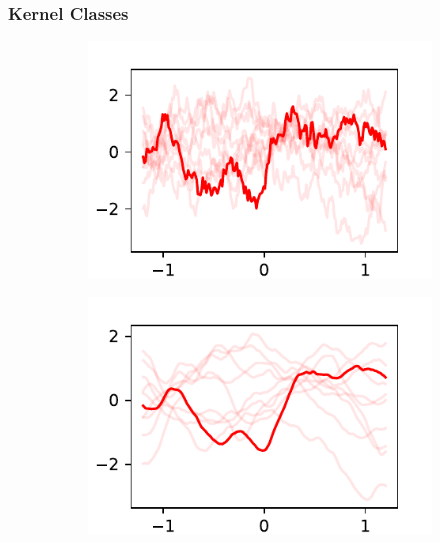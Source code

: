 \documentclass{beamer}
\begin{document}
\begin{frame}
    \frametitle{Kernel Classes}
    \begin{figure}
        \centering
        \begin{subfigure}[t]{0.4\textwidth}
            \centering
            \includegraphics[width=\textwidth]{maternonehalf_kernel.pdf}
        \end{subfigure}%
        \begin{subfigure}[t]{0.4\textwidth}
            \centering
            \includegraphics[width=\textwidth]{maternthreehalves_kernel.pdf}
        \end{subfigure}
        \begin{subfigure}[t]{0.4\textwidth}
            \centering

\end{subfigure}
\end{figure}
\end{frame}
\end{document}
